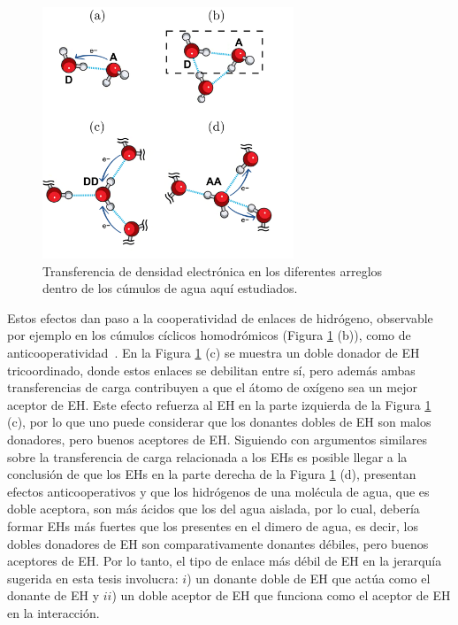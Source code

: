 \begin{figure}[hb]%
    \centering
    \includegraphics[width=0.67\textwidth]{4/img/figura5}
    \caption{Transferencia de densidad electrónica en los diferentes arreglos dentro de los cúmulos de agua aquí estudiados.}
\label{transferencia_2}
\end{figure}

Estos efectos dan paso a la cooperatividad de enlaces de hidrógeno, observable
por ejemplo en los cúmulos cíclicos homodrómicos (Figura \ref{transferencia_2}
(b)), como de anticooperatividad~\cite{steiner}. En la Figura
\ref{transferencia_2} (c) se muestra un doble donador de EH tricoordinado,
donde estos enlaces se debilitan entre sí, pero además ambas transferencias de
carga contribuyen a que el átomo de oxígeno sea un mejor aceptor de EH. Este
efecto refuerza al EH en la parte izquierda de la Figura \ref{transferencia_2}
(c), por lo que uno puede considerar que los donantes dobles de EH son malos
donadores, pero buenos aceptores de EH. Siguiendo con argumentos similares
sobre la transferencia de carga relacionada a los EHs es posible llegar a la
conclusión de que los EHs en la parte derecha de la Figura
\ref{transferencia_2} (d), presentan efectos anticooperativos y que los
hidrógenos de una molécula de agua, que es doble aceptora, son más ácidos que
los del agua aislada, por lo cual, debería formar EHs más fuertes que los
presentes en el dimero de agua, es decir, los dobles donadores de EH son
comparativamente donantes débiles, pero buenos aceptores de EH.  Por lo tanto,
el tipo de enlace más débil de EH en la jerarquía sugerida en esta tesis
involucra: $i$) un donante doble de EH que actúa como el donante de EH y $ii$)
un doble aceptor de EH que funciona como el aceptor de EH en la interacción.


